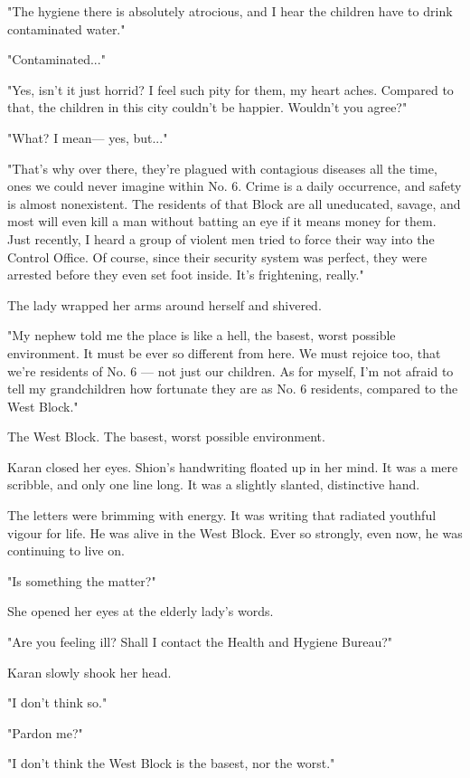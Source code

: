 "The hygiene there is absolutely atrocious, and I hear the children have
to drink contaminated water."

"Contaminated..."

"Yes, isn't it just horrid? I feel such pity for them, my heart aches.
Compared to that, the children in this city couldn't be happier.
Wouldn't you agree?"

"What? I mean--- yes, but..."

"That's why over there, they're plagued with contagious diseases all the
time, ones we could never imagine within No. 6. Crime is a daily
occurrence, and safety is almost nonexistent. The residents of that
Block are all uneducated, savage, and most will even kill a man without
batting an eye if it means money for them. Just recently, I heard a
group of violent men tried to force their way into the Control Office.
Of course, since their security system was perfect, they were arrested
before they even set foot inside. It's frightening, really."

The lady wrapped her arms around herself and shivered.

"My nephew told me the place is like a hell, the basest, worst possible
environment. It must be ever so different from here. We must rejoice
too, that we're residents of No. 6 --- not just our children. As for
myself, I'm not afraid to tell my grandchildren how fortunate they are
as No. 6 residents, compared to the West Block."

The West Block. The basest, worst possible environment.

Karan closed her eyes. Shion's handwriting floated up in her mind. It
was a mere scribble, and only one line long. It was a slightly slanted,
distinctive hand.


The letters were brimming with energy. It was writing that radiated
youthful vigour for life. He was alive in the West Block. Ever so
strongly, even now, he was continuing to live on.

"Is something the matter?"

She opened her eyes at the elderly lady's words.

"Are you feeling ill? Shall I contact the Health and Hygiene Bureau?"

Karan slowly shook her head.

"I don't think so."

"Pardon me?"

"I don't think the West Block is the basest, nor the worst."


